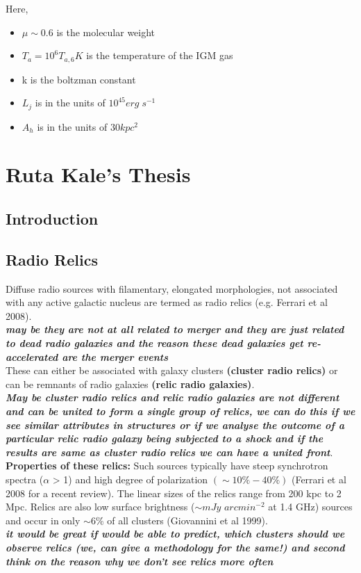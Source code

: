 \documentclass[11pt]{report}
\newcommand{\tbf}[1]{\textbf{#1}}
\newcommand{\tit}[1]{\textit{#1}}
\begin{document}
Here,
\begin{itemize}
\item $\mu \sim 0.6$ is the molecular weight\\
\item $T_a=10^6 T_{a,6}K$ is the temperature of the IGM gas
\item k is the boltzman constant
\item $L_j$ is in the units of $10^{45}erg\; s^{-1}$ 
\item $A_h$ is in the units of $30kpc^2$
\end{itemize}

\chapter{Ruta Kale's Thesis}
\section{Introduction}
\section{Radio Relics}
Diffuse radio sources with filamentary, elongated morphologies, not associated with any active galactic nucleus are termed as radio relics (e.g. Ferrari et al 2008). \\
\textbf{\tit{may be they are not at all related to merger and they are just related to dead radio galaxies and the reason these dead galaxies get re-accelerated are the merger events}}\\
These can either be associated with galaxy clusters \tbf{(cluster radio relics)} or can be remnants of radio galaxies \tbf{(relic radio galaxies)}.\\
\textbf{\tit{May be cluster radio relics and relic radio galaxies are not different and can be united to form a single group of relics, we can do this if we see similar attributes in structures or if we analyse the outcome of a particular relic radio galaxy being subjected to a shock and if the results are same as cluster radio relics we can have a united front}}.\\
\textbf{Properties of these relics:}
Such sources typically have steep synchrotron spectra ($\alpha$ > 1) and high degree of polarization $(\sim 10\% - 40\%)$ (Ferrari et al 2008 for a recent review). The linear sizes of the relics range from
200 kpc to 2 Mpc. Relics are also low surface brightness ($\sim mJy$ $arcmin^{-2}$ at 1.4 GHz) sources and occur in only $\sim 6\%$ of all clusters (Giovannini et al 1999). \\
\textbf{\tit{it would be great if would be able to predict, which clusters should we observe relics (we, can give a methodology for the same!) and second think on the reason why we don't see relics more often}}
\end{document}
